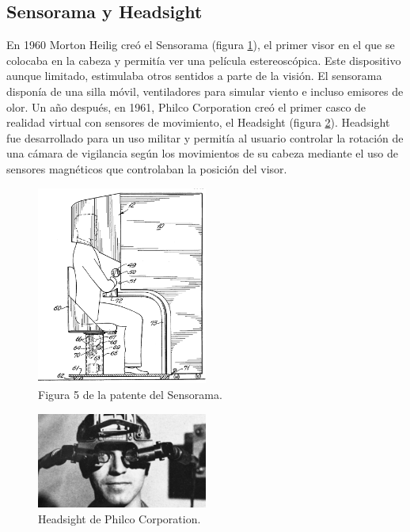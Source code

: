 \subsection{Sensorama y Headsight}

En 1960 Morton Heilig creó el Sensorama (figura \ref{fig:EA_sensorama}), el primer visor en el que se colocaba en la cabeza y permitía ver una película estereoscópica. Este dispositivo aunque limitado, estimulaba otros sentidos a parte de la visión. El sensorama disponía de una silla móvil, ventiladores para simular viento e incluso emisores de olor.  Un año después, en 1961, Philco Corporation creó el primer casco de realidad virtual con sensores de movimiento, el Headsight (figura \ref{fig:EA_headsight}). Headsight fue desarrollado para un uso militar y permitía al usuario controlar la rotación de una cámara de vigilancia según los movimientos de su cabeza mediante el uso de sensores magnéticos que controlaban la posición del visor.

\begin{figure}[H]
	\centering
	\includegraphics[width=0.5\textwidth]{03.EstudioProblema/01.EstadoArte/00.Figuras/34.sensorama.png}
	\caption{Figura 5 de la patente del Sensorama. \cite{EA_img_sensorama}}
	\label{fig:EA_sensorama}
\end{figure}

\begin{figure}[H]
  \centering
\includegraphics[width=0.5\textwidth]{03.EstudioProblema/01.EstadoArte/00.Figuras/15.headsight.png}
    \caption{Headsight de Philco Corporation. \cite{EA_img_headsight}}
    \label{fig:EA_headsight}
\end{figure}



